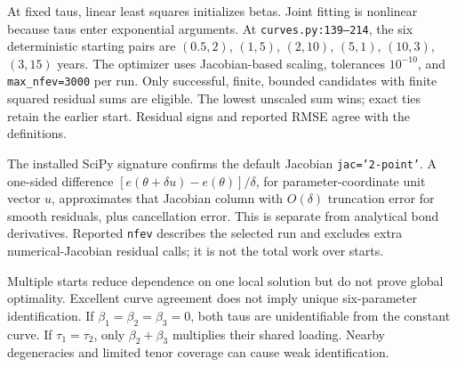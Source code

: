 \documentclass[12pt,a4paper]{article}
\begin{document}
At fixed taus, linear least squares initializes betas. Joint fitting is
nonlinear because taus enter exponential arguments.
At \texttt{curves.py:139--214}, the six deterministic starting pairs are
$(0.5,2)$, $(1,5)$, $(2,10)$, $(5,1)$, $(10,3)$, $(3,15)$ years.
The optimizer uses Jacobian-based scaling, tolerances $10^{-10}$, and
\texttt{max\_nfev=3000} per run.
Only successful, finite, bounded candidates with finite squared residual
sums are eligible. The lowest unscaled sum wins; exact ties retain the
earlier start. Residual signs and reported RMSE agree with the definitions.

The installed SciPy signature confirms the default Jacobian
\texttt{jac='2-point'}. A one-sided difference
$[e(\theta+\delta u)-e(\theta)]/\delta$, for parameter-coordinate unit vector
$u$, approximates that Jacobian column with $O(\delta)$ truncation error
for smooth residuals, plus cancellation error. This is separate from
analytical bond derivatives. Reported \texttt{nfev} describes the selected
run and excludes extra numerical-Jacobian residual calls; it is not the
total work over starts.

Multiple starts reduce dependence on one local solution but do not prove
global optimality. Excellent curve agreement does not imply unique
six-parameter identification. If $\beta_1=\beta_2=\beta_3=0$, both taus
are unidentifiable from the constant curve. If $\tau_1=\tau_2$, only
$\beta_2+\beta_3$ multiplies their shared loading. Nearby degeneracies
and limited tenor coverage can cause weak identification.
\end{document}
